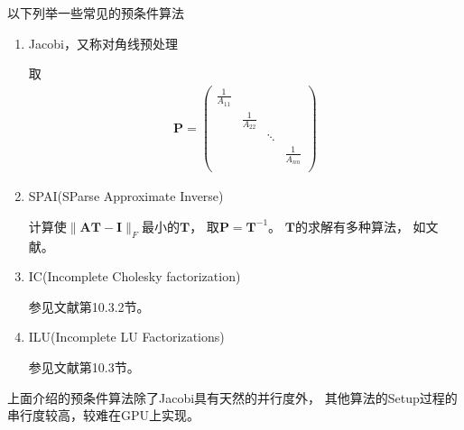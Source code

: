 以下列举一些常见的预条件算法
\begin{enumerate}
\item Jacobi，又称对角线预处理

取\cite{saad2003iterative}
\begin{align}
  \bm{P}=\begin{pmatrix}
  \displaystyle \frac{1}{A_{11}} & & &\\
  & \displaystyle \frac{1}{A_{22}} & &\\
  & & \ddots &\\
  & & & \displaystyle \frac{1}{A_{nn}}\\
  \end{pmatrix}
\end{align}

\item SPAI(SParse Approximate Inverse)\cite{saad2003iterative}

计算使$\|\bm{AT}-\bm{I}\|_F$最小的$\bm{T}$，
取$\bm{P}=\bm{T}^{-1}$。
$\bm{T}$的求解有多种算法，
如文献。

\item IC(Incomplete Cholesky factorization)

参见文献第10.3.2节。

\item ILU(Incomplete LU Factorizations)

参见文献第10.3节。

\end{enumerate}
上面介绍的预条件算法除了Jacobi具有天然的并行度外，
其他算法的Setup过程的串行度较高，较难在GPU上实现。


